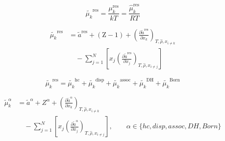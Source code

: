 \documentclass[12pt, letterpaper]{article}
\begin{document}
\begin{equation}
    \tilde{\mu_{k}}^{\mathrm{res}}=\frac{\mu_{k}^\mathrm{res}}{kT} = \frac{\hat{\mu}_{k}^\mathrm{res}}{RT}
    \label{eq:mu_res}
\end{equation}


\begin{equation}
    \begin{aligned}
        \tilde{\mu_{k}}^{\mathrm{res}}
        &=\tilde{a}^{\mathrm{res}}+(\mathrm{Z}-1)
        +\left(\frac{\partial\tilde{a}^{\mathrm{res}}}{\partial x_{k}}\right)_{T,\hat{\rho},x_{i\neq k}}
        \\
        &\quad -\sum_{j=1}^{N}\left[x_{j}\left(\frac{\partial\tilde{a}^{\mathrm{res}}}{\partial x_{j}}\right)_{T,\hat{\rho},x_{i\neq j}}\right]
    \end{aligned}
    \label{eq:mu_res_from_ares}
\end{equation}


\begin{equation}
    \tilde{\mu_{k}}^{\mathrm{res}}=\tilde{\mu_{k}}^{\mathrm{hc}}+\tilde{\mu_{k}}^{\mathrm{disp}}+\tilde{\mu_{k}}^{\mathrm{assoc}}+\tilde{\mu_{k}}^{\mathrm{DH}}+\tilde{\mu_{k}}^{\mathrm{Born}}
    \label{eq:mu_res_sum}
\end{equation}


\begin{equation}
    \begin{aligned}
        \tilde{\mu}^{\alpha}_{k}
        &=
        \tilde{a}^{\alpha}
        + Z^{\alpha}
        +\left(\frac{\partial\tilde{a}^{\alpha}}{\partial x_{k}}\right)_{T,\hat{\rho},x_{i\neq k}}
        \\
        &\quad
        -\sum_{j=1}^{N}\left[x_{j}\left(\frac{\partial\tilde{a}^{\alpha}}{\partial x_{j}}\right)_{T,\hat{\rho},x_{i\neq j}}\right],
        \qquad
        \alpha\in\{hc,disp,assoc,DH,Born\}
    \end{aligned}
    \label{eq:mu_alpha}
\end{equation}
\end{document}

